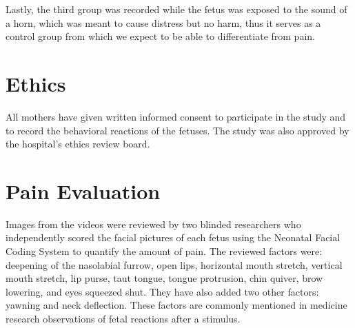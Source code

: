 Lastly, the third group was recorded while the fetus was exposed to the sound of a horn, which was meant to cause distress but no harm, thus it serves as a control group from which we expect to be able to differentiate from pain.

\section{Ethics}

All mothers have given written informed consent to participate in the study and to record the behavioral reactions of the fetuses. The study was also approved by the hospital's ethics review board.

\section{Pain Evaluation}

Images from the videos were reviewed by two blinded researchers who independently scored the facial pictures of each fetus using the Neonatal Facial Coding System to quantify the amount of pain. The reviewed factors were: deepening of the nasolabial furrow, open lips, horizontal mouth stretch, vertical mouth stretch, lip purse, taut tongue, tongue protrusion, chin quiver, brow lowering, and eyes squeezed shut. They have also added two other factors: yawning and neck deflection. These factors are commonly mentioned in medicine research observations of fetal reactions after a stimulus.

